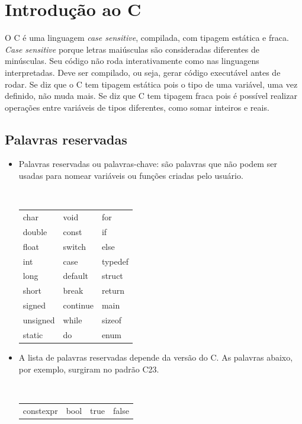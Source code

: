 \chapter{Introdução ao C}

\setcounter{page}{1}    %

O C é uma linguagem {\it case sensitive}, compilada, com tipagem estática e fraca. 
{\it Case sensitive} porque letras maiúsculas são consideradas diferentes de minúsculas. Seu código não roda interativamente como nas linguagens interpretadas. Deve ser compilado, ou seja, gerar código executável antes de rodar. Se diz que o C tem tipagem estática pois o tipo de uma variável, uma vez definido, não muda mais. Se diz que C tem tipagem fraca pois é possível realizar operações entre variáveis de tipos diferentes, como somar inteiros e reais.


\section{Palavras reservadas}

\begin{itemize}

\item Palavras reservadas ou palavras-chave: são palavras que não podem ser usadas para nomear variáveis ou funções criadas pelo usuário.

{\tt
\begin{tabular}{lll}
char     & void     & for     \\
double   & const    & if      \\
float    & switch   & else    \\
int      & case     & typedef \\
long     & default  & struct  \\
short    & break    & return  \\
signed   & continue & main    \\
unsigned & while    & sizeof  \\
static   & do       & enum    \\
\end{tabular}
}

\item A lista de palavras reservadas depende da versão do C. As palavras abaixo, por exemplo, surgiram no padrão C23.

{\tt
\begin{tabular}{llll}
constexpr & bool     & true     & false   \\
\end{tabular}
}



\end{itemize}


